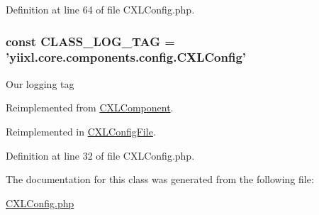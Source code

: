 Definition at line 64 of file CXLConfig.php.

\hypertarget{classCXLConfig_aa607ab5e557e6ebb60b85c5a20ad067f}{
\subsubsection[{CLASS\_\-LOG\_\-TAG}]{\setlength{\rightskip}{0pt plus 5cm}const {\bf CLASS\_\-LOG\_\-TAG} = 'yiixl.core.components.config.CXLConfig'}}
\label{classCXLConfig_aa607ab5e557e6ebb60b85c5a20ad067f}
Our logging tag 

Reimplemented from \hyperlink{classCXLComponent_aa607ab5e557e6ebb60b85c5a20ad067f}{CXLComponent}.



Reimplemented in \hyperlink{classCXLConfigFile_aa607ab5e557e6ebb60b85c5a20ad067f}{CXLConfigFile}.



Definition at line 32 of file CXLConfig.php.



The documentation for this class was generated from the following file:\begin{DoxyCompactItemize}
\item 
\hyperlink{CXLConfig_8php}{CXLConfig.php}\end{DoxyCompactItemize}
